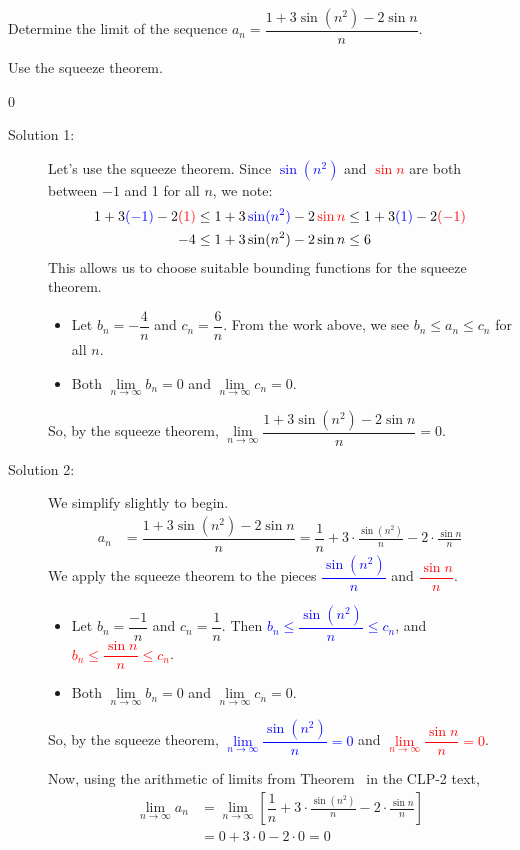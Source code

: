 \begin{question}
Determine the limit of the sequence
$a_n = \dfrac{1+3\sin(n^2)-2\sin n}{n}$.
\end{question}
\begin{hint}
Use the squeeze theorem.
\end{hint}
\begin{answer}
0
\end{answer}
\begin{solution}
\begin{description}
\item[Solution 1:] Let's use the squeeze theorem. Since \textcolor{blue}{$\sin (n^2)$} and \textcolor{red}{$\sin n$} are both between $-1$ and 1 for all $n$, we note:
\begin{align*}
1 +3\textcolor{blue}{(-1)}-2\textcolor{red}{(1)}&\leq 1+3\,\textcolor{blue}{\sin(n^2)}-2\,\textcolor{red}{\sin n} \leq 1 +3\textcolor{blue}{(1)}-2\textcolor{red}{(-1)}\\
-4&\leq 1+3\,{\sin(n^2)}-2\,{\sin n} \leq 6
\end{align*}
This allows us to choose suitable bounding functions for the squeeze theorem.
\begin{itemize}
\item Let $b_n = -\dfrac{4}{n}$ and $c_n = \dfrac{6}{n}$. From the work above, we see
$b_n \leq a_n \leq c_n$ for all $n$.
\item Both $\lim\limits_{n \to \infty}b_n=0$ and $\lim\limits_{n \to \infty}c_n=0$.
\end{itemize}
So, by the squeeze theorem,
$\lim\limits_{n \to \infty} \dfrac{1+3\sin(n^2)-2\sin n}{n}=0$.

\item[Solution 2:] We simplify slightly to begin.
\begin{align*}
a_n &= \dfrac{1+3\sin(n^2)-2\sin n}{n} = \dfrac{1}{n}+3\cdot\frac{\sin (n^2)}{n} - 2\cdot\frac{\sin n}{n}
\end{align*}
We  apply the squeeze theorem to the pieces \textcolor{blue}{$\dfrac{\sin (n^2)}{n} $} and \textcolor{red}{$\dfrac{\sin n}{n}$}.
\begin{itemize}
\item Let $b_n = \dfrac{-1}{n}$ and $c_n = \dfrac{1}{n}$. Then \textcolor{blue}{$b_n \leq \dfrac{\sin (n^2)}{n}  \leq c_n$}, and \textcolor{red}{$b_n \leq  \dfrac{\sin n}{n} \leq c_n$}.
\item Both $\lim\limits_{n \to \infty} b_n=0$ and $\lim\limits_{n \to \infty} c_n=0$.
\end{itemize}
So, by the squeeze theorem, \textcolor{blue}{$\lim\limits_{n \to \infty}\dfrac{\sin (n^2)}{n} =0$} and \textcolor{red}{$\lim\limits_{n \to \infty}\dfrac{\sin n}{n}=0$}.

Now, using the arithmetic of limits from Theorem~ in the CLP-2 text,
\begin{align*}
\lim_{n \to \infty}a_n &=\lim_{n \to \infty}\left[ \dfrac{1}{n}+3\cdot\frac{\sin (n^2)}{n} - 2\cdot\frac{\sin n}{n}\right]\\
&=0+3\cdot 0 - 2\cdot 0 =0
\end{align*}
\end{description}
\end{solution}

